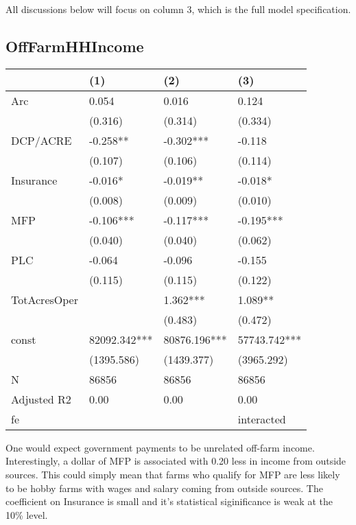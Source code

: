 \documentclass[11pt]{article}
\begin{document}
All discussions below will focus on column 3, which is the full model specification. 

\subsection{OffFarmHHIncome}
\label{sec:org10716ea}

\begin{center}
\begin{tabular}{llll}
\hline
 & (1) & (2) & (3)\\[0pt]
\hline
Arc & 0.054 & 0.016 & 0.124\\[0pt]
 & (0.316) & (0.314) & (0.334)\\[0pt]
DCP/ACRE & -0.258** & -0.302*** & -0.118\\[0pt]
 & (0.107) & (0.106) & (0.114)\\[0pt]
Insurance & -0.016* & -0.019** & -0.018*\\[0pt]
 & (0.008) & (0.009) & (0.010)\\[0pt]
MFP & -0.106*** & -0.117*** & -0.195***\\[0pt]
 & (0.040) & (0.040) & (0.062)\\[0pt]
PLC & -0.064 & -0.096 & -0.155\\[0pt]
 & (0.115) & (0.115) & (0.122)\\[0pt]
TotAcresOper &  & 1.362*** & 1.089**\\[0pt]
 &  & (0.483) & (0.472)\\[0pt]
const & 82092.342*** & 80876.196*** & 57743.742***\\[0pt]
 & (1395.586) & (1439.377) & (3965.292)\\[0pt]
N & 86856 & 86856 & 86856\\[0pt]
Adjusted R2 & 0.00 & 0.00 & 0.00\\[0pt]
fe &  &  & interacted\\[0pt]
\end{tabular}
\end{center}

One would expect government payments to be unrelated off-farm income. Interestingly, a dollar of MFP is associated with 0.20 less in income from outside sources. This could simply mean that farms who qualify for MFP are less likely to be hobby farms with wages and salary coming from outside sources. The coefficient on Insurance is small and it's statistical siginificance is weak at the 10\% level. 
\end{document}
